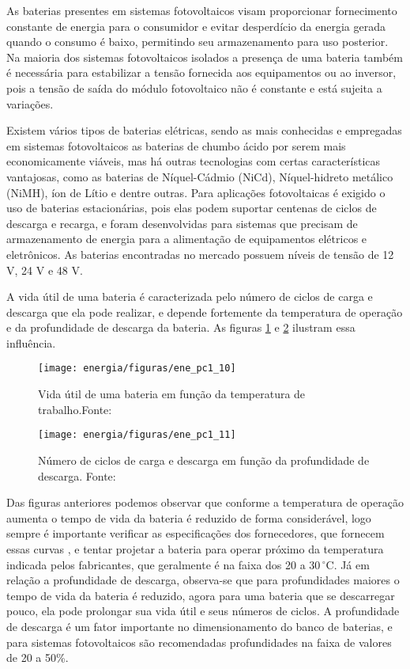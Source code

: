 	As baterias presentes em sistemas fotovoltaicos visam proporcionar fornecimento constante de energia para o consumidor e evitar desperdício da energia gerada quando o consumo é baixo, permitindo seu armazenamento para uso posterior. Na maioria dos sistemas fotovoltaicos isolados a presença de uma bateria também é necessária para estabilizar a tensão fornecida aos equipamentos ou ao inversor, pois a tensão de saída do módulo fotovoltaico não é constante e está sujeita a variações. \cite{Villalva}
	
 Existem vários tipos de baterias elétricas, sendo as mais conhecidas e empregadas em sistemas fotovoltaicos as baterias de chumbo ácido por serem mais economicamente viáveis, mas há outras tecnologias com certas características vantajosas, como as baterias de Níquel-Cádmio (NiCd), Níquel-hidreto metálico (NiMH), íon de Lítio e dentre outras. Para aplicações fotovoltaicas é exigido o uso de baterias estacionárias, pois elas podem suportar centenas de ciclos de descarga e recarga, e foram desenvolvidas para sistemas que precisam de armazenamento de energia para a alimentação de equipamentos elétricos e eletrônicos. As baterias encontradas no mercado possuem níveis de tensão de 12 V, 24 V e 48 V.
	
	A vida útil de uma bateria é caracterizada pelo número de ciclos de carga e descarga que ela pode realizar, e depende fortemente da temperatura de operação e da profundidade de descarga da bateria. As figuras \ref{ene_pc1_10} e \ref{ene_pc1_11} ilustram essa influência.
	
		
\begin{figure}[H]
		\centering
		\texttt{[image: energia/figuras/ene\_pc1\_10]}
		\caption{Vida útil de uma bateria em função da temperatura de trabalho.Fonte: \cite{Freedom}}
		\label{ene_pc1_10}
	\end{figure}
	
\begin{figure}[H]
		\centering
		\texttt{[image: energia/figuras/ene\_pc1\_11]}
		\caption{Número de ciclos de carga e descarga em função da profundidade de descarga. Fonte: \cite{Freedom}}
		\label{ene_pc1_11}
	\end{figure}


	Das figuras anteriores podemos observar que conforme a temperatura de operação aumenta o tempo de vida da bateria é reduzido de forma considerável, logo sempre é importante verificar as especificações dos fornecedores, que fornecem essas curvas , e tentar projetar a bateria para operar próximo da temperatura indicada pelos fabricantes, que geralmente é na faixa dos 20 a $30\,^{\circ}\mathrm{C}$. Já em relação a profundidade de descarga, observa-se que para profundidades maiores o tempo de vida da bateria é reduzido, agora para uma bateria que se descarregar pouco, ela pode prolongar sua vida útil e seus números de ciclos. A profundidade de descarga é um fator importante no dimensionamento do banco de baterias, e para sistemas fotovoltaicos são recomendadas profundidades na faixa de valores de 20 a 50\%.
	
